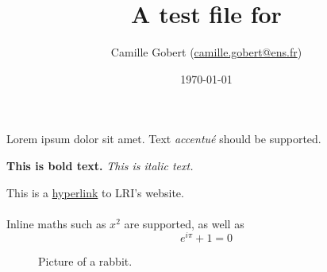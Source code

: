 \documentclass[11pt]{article}
\title{A test file for \iLaTeX}
\author{Camille Gobert (\url{camille.gobert@ens.fr})}
\date{\today}
\begin{document}
    \maketitle
    
    Lorem ipsum dolor sit amet.
    Text \emph{accentu\'e} should be supported.
    
    \textbf{This is bold text.}
    \textit{This is italic text.}
    
    This is a \href{https://www.lri.fr/}{hyperlink} to LRI's website.
    
    \paragraph{}
    Inline maths such as $x^2$ are supported, as well as 
    $$e^{i\pi} + 1 = 0$$
    
    \begin{table}[h]
        \centering
        \caption{Random table.}
        \label{tab:random}
    \end{table}

    \begin{figure}[h]
        \centering
        \caption{Picture of a rabbit.}
        \label{fig:rabbit}
    \end{figure}
\end{document}
